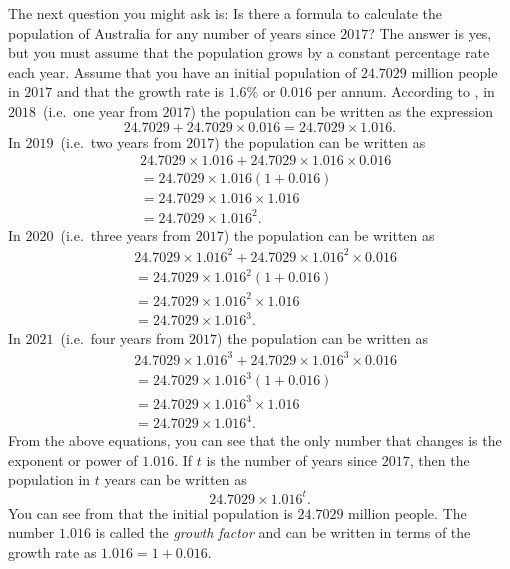 \documentclass[a4paper,oneside,12pt]{article}
\begin{document}
The next question you might ask is:  Is there a formula to calculate
the population of Australia for any number of years since $2017$?  The
answer is yes, but you must assume that the population grows by a
constant percentage rate each year.  Assume that you have an initial
population of $24.7029$ million people in $2017$ and that the growth
rate is $1.6\%$ or $0.016$ per annum.  According to
, in
$2018$~(i.e.~one year from $2017$) the population can be written as
the expression
\[
24.7029 + 24.7029 \times 0.016
=
24.7029 \times 1.016.
\]
In $2019$~(i.e.~two years from $2017$) the population can be written
as
\begin{align*}
&24.7029 \times 1.016 + 24.7029 \times 1.016 \times 0.016 \\[4pt]
&=
24.7029 \times 1.016 (1 + 0.016) \\[4pt]
&=
24.7029 \times 1.016 \times 1.016 \\[4pt]
&=
24.7029 \times 1.016^2.
\end{align*}
In $2020$~(i.e.~three years from $2017$) the population can be written
as
\begin{align*}
&24.7029 \times 1.016^2 + 24.7029 \times 1.016^2 \times 0.016 \\[4pt]
&=
24.7029 \times 1.016^2 (1 + 0.016) \\[4pt]
&=
24.7029 \times 1.016^2 \times 1.016 \\[4pt]
&=
24.7029 \times 1.016^3.
\end{align*}
In $2021$~(i.e.~four years from $2017$) the population can be written
as
\begin{align*}
&24.7029 \times 1.016^3 + 24.7029 \times 1.016^3 \times 0.016 \\[4pt]
&=
24.7029 \times 1.016^3 (1 + 0.016) \\[4pt]
&=
24.7029 \times 1.016^3 \times 1.016 \\[4pt]
&=
24.7029 \times 1.016^4.
\end{align*}
From the above equations, you can see that the only number that
changes is the exponent or power of $1.016$.  If $t$ is the number of
years since $2017$, then the population in $t$ years can be written as
\begin{equation}
\label{eqn:Australian_population_formula}
24.7029 \times 1.016^t.
\end{equation}
You can see from  that
the initial population is $24.7029$ million people.  The number
$1.016$ is called the \emph{growth factor} and can be written in terms
of the growth rate as $1.016 = 1 + 0.016$.
\end{document}
